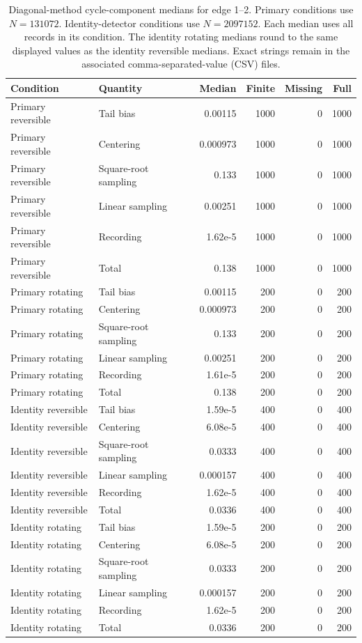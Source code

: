 \begingroup\small\setlength{\tabcolsep}{4pt}
\begin{longtable}{@{}llrrrr@{}}
\caption{Diagonal-method cycle-component medians for edge 1--2. Primary conditions use $N=131072$. Identity-detector conditions use $N=2097152$. Each median uses all records in its condition. The identity rotating medians round to the same displayed values as the identity reversible medians. Exact strings remain in the associated comma-separated-value (CSV) files.}\label{tab:src16:cycle-examples}\\
\toprule
Condition & Quantity & Median & Finite & Missing & Full \\\midrule\endhead
Primary reversible & Tail bias & 0.00115 & 1000 & 0 & 1000 \\
Primary reversible & Centering & 0.000973 & 1000 & 0 & 1000 \\
Primary reversible & Square-root sampling & 0.133 & 1000 & 0 & 1000 \\
Primary reversible & Linear sampling & 0.00251 & 1000 & 0 & 1000 \\
Primary reversible & Recording & 1.62e-5 & 1000 & 0 & 1000 \\
Primary reversible & Total & 0.138 & 1000 & 0 & 1000 \\
\addlinespace
Primary rotating & Tail bias & 0.00115 & 200 & 0 & 200 \\
Primary rotating & Centering & 0.000973 & 200 & 0 & 200 \\
Primary rotating & Square-root sampling & 0.133 & 200 & 0 & 200 \\
Primary rotating & Linear sampling & 0.00251 & 200 & 0 & 200 \\
Primary rotating & Recording & 1.61e-5 & 200 & 0 & 200 \\
Primary rotating & Total & 0.138 & 200 & 0 & 200 \\
\addlinespace
Identity reversible & Tail bias & 1.59e-5 & 400 & 0 & 400 \\
Identity reversible & Centering & 6.08e-5 & 400 & 0 & 400 \\
Identity reversible & Square-root sampling & 0.0333 & 400 & 0 & 400 \\
Identity reversible & Linear sampling & 0.000157 & 400 & 0 & 400 \\
Identity reversible & Recording & 1.62e-5 & 400 & 0 & 400 \\
Identity reversible & Total & 0.0336 & 400 & 0 & 400 \\
\addlinespace
Identity rotating & Tail bias & 1.59e-5 & 200 & 0 & 200 \\
Identity rotating & Centering & 6.08e-5 & 200 & 0 & 200 \\
Identity rotating & Square-root sampling & 0.0333 & 200 & 0 & 200 \\
Identity rotating & Linear sampling & 0.000157 & 200 & 0 & 200 \\
Identity rotating & Recording & 1.62e-5 & 200 & 0 & 200 \\
Identity rotating & Total & 0.0336 & 200 & 0 & 200 \\
\bottomrule\end{longtable}
\endgroup
